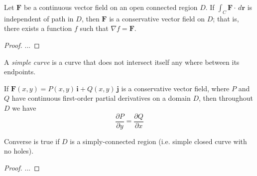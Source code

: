 \documentclass[../main.tex]{subfiles}
\begin{document}
\begin{theorem}
Let $\textbf{F}$ be a continuous vector field on an open connected region $D$. If $\int_C{\textbf{F}\cdot\,d\textbf{r}}$ is independent of path in $D$, then $\textbf{F}$ is a conservative vector field on $D$; that is, there exists a function $f$ such that $\nabla f = \textbf{F}$.
\end{theorem}
\begin{proof}
...
\end{proof}

\begin{definition}
A \textit{simple curve} is a curve that does not intersect itself any where between its endpoints.
\end{definition}

\begin{theorem}
If $\textbf{F}(x,y)=P(x,y)\,\textbf{i}+Q(x,y)\,\textbf{j}$ is a conservative vector field, where $P$ and $Q$ have continuous first-order partial derivatives on a domain $D$, then throughout $D$ we have
\begin{equation*}
\frac{\partial P}{\partial y} = \frac{\partial Q}{\partial x}
\end{equation*}
\end{theorem}
Converse is true if $D$ is a simply-connected region (i.e. simple closed curve with no holes).
\begin{proof}
...
\end{proof}
\end{document}
